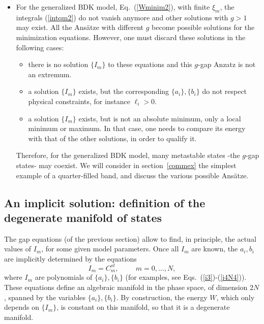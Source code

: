 \documentclass[]{revtex4-1}
\begin{document}
\begin{itemize}
\item For the generalized BDK model, Eq.~(\ref{Wminim2}), with finite $\xi_m$, the integrals (\ref{intqm2}) do not vanish anymore and other solutions with $g>1$ may exist.
All the Ans\"atze with different $g$ become possible solutions for the minimization equations. However, one must discard these solutions in the following cases: \begin{itemize} \item there is no solution $\{I_m\}$ to these equations and this $g$-gap Anzatz is not an extremum. \item a solution $\{I_m\}$ exists, but the corresponding $\{a_i\}, \{b_i\}$ do not respect physical constraints, for instance $\ell_i>0$. \item a solution $\{I_m\}$ exists, but is not an absolute minimum, only a local minimum or maximum. In that case, one needs to compare its energy with that of the other solutions, in order to qualify it. \end{itemize}
Therefore, for the generalized BDK model, many metastable states -the $g$-gap states- may coexist.
We will consider in section~\ref{commex} the simplest example of a quarter-filled band, and discuss the various possible Ans\"atze.
\end{itemize}

\subsection{An implicit solution: definition of the degenerate manifold of states}
\label{implicitsolution}

The gap equations (of the previous section) allow to find, in principle, the actual values of $I_m$, for some given model parameters. Once all $I_m$ are known, the $a_i, b_i$ are implicitly determined by the equations
\begin{equation} I_m=C^{st}_m, \hspace{1cm} m=0,\dots,N, \end{equation} where $I_m$ are polynomials of $\{a_i\},\{b_i\}$ (for examples, see Eqs.~(\ref{i3})-(\ref{i4N4})). These equations define an algebraic manifold in the phase space, of dimension $2N$, spanned by the variables $\{a_i\}, \{b_i\}$.
By construction, the energy $W$, which only depends on $\{I_m\}$, is constant on this manifold, so that it is a degenerate manifold.
\end{document}
